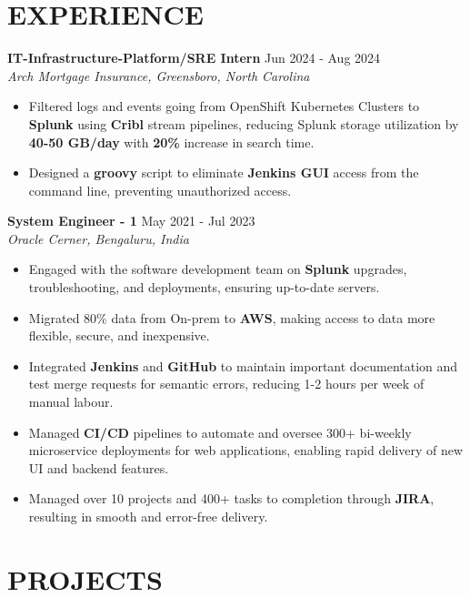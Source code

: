 \documentclass[a4paper,9pt]{extarticle}
\begin{document}
\section*{EXPERIENCE}
\noindent
\textbf{IT-Infrastructure-Platform/SRE Intern}
\hfill Jun 2024 - Aug 2024\\ %
\textit{Arch Mortgage Insurance, Greensboro, North Carolina}
\begin{itemize}
    \item Filtered logs and events going from OpenShift Kubernetes Clusters to \textbf{Splunk} using \textbf{Cribl} stream pipelines, reducing Splunk storage utilization by \textbf{40-50 GB/day} with \textbf{20\%} increase in search time.
    \item Designed a \textbf{groovy} script to eliminate \textbf{Jenkins GUI} access from the command line, preventing unauthorized access.
    

\end{itemize}

\noindent
\textbf{System Engineer - 1}
\hfill May 2021 - Jul 2023\\ %
\textit{Oracle Cerner, Bengaluru, India}
\begin{itemize}
    \item Engaged with the software development team on \textbf{Splunk} upgrades, troubleshooting, and deployments, ensuring up-to-date servers.
    \item Migrated 80\% data from On-prem to \textbf{AWS}, making access to data more flexible, secure, and inexpensive.
    \item Integrated \textbf{Jenkins} and \textbf{GitHub} to maintain important documentation and test merge requests for semantic errors, reducing 1-2 hours per week of manual labour.
    \item Managed \textbf{CI/CD} pipelines to automate and oversee 300+ bi-weekly microservice deployments for web applications, enabling rapid delivery of new UI and backend features.
    \item Managed over 10 projects and 400+ tasks to completion through \textbf{JIRA}, resulting in smooth and error-free delivery. 
\end{itemize}



\section*{PROJECTS}
\end{document}
